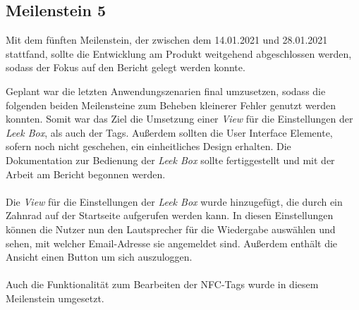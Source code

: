 \documentclass[10pt, a4paper]{article}
\begin{document}
\begin{onehalfspace}
\subsection{Meilenstein 5}
Mit dem fünften Meilenstein, der zwischen dem 14.01.2021 und 28.01.2021 stattfand, sollte die Entwicklung am Produkt weitgehend abgeschlossen werden, sodass der Fokus auf den Bericht gelegt werden konnte.

Geplant war die letzten Anwendungszenarien final umzusetzen, sodass die folgenden beiden Meilensteine zum Beheben kleinerer Fehler genutzt werden konnten.
Somit war das Ziel die Umsetzung einer \textit{View} für die Einstellungen der \textit{Leek Box}, als auch der Tags.
Außerdem sollten die User Interface Elemente, sofern noch nicht geschehen, ein einheitliches Design erhalten.
Die Dokumentation zur Bedienung der \textit{Leek Box} sollte fertiggestellt und mit der Arbeit am Bericht begonnen werden.
\\~\\
Die \textit{View} für die Einstellungen der \textit{Leek Box} wurde hinzugefügt, die durch ein Zahnrad auf der Startseite aufgerufen werden kann.
In diesen Einstellungen können die Nutzer nun den Lautsprecher für die Wiedergabe auswählen und sehen, mit welcher Email-Adresse sie angemeldet sind. Außerdem enthält die Ansicht einen Button um sich auszuloggen.
\\~\\
Auch die Funktionalität zum Bearbeiten der NFC-Tags wurde in diesem Meilenstein umgesetzt.

\end{onehalfspace}
\end{document}
